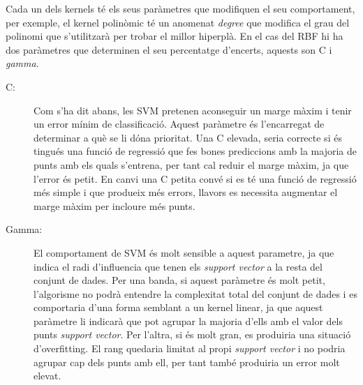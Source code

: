 \documentclass[10pt,a4paper,twocolumn,twoside]{article}
\begin{document}
Cada un dels kernels té els seus paràmetres que modifiquen el seu comportament, per exemple, el kernel polinòmic té un anomenat \textit{degree} que modifica el grau del polinomi que s'utilitzarà per trobar el millor hiperplà. En el cas del RBF hi ha dos paràmetres que determinen el seu percentatge d'encerts, aquests son C i \textit{gamma}.
\begin{description}
\item[C:] Com s'ha dit abans, les SVM pretenen aconseguir un marge màxim i tenir un error mínim de classificació. Aquest paràmetre és l'encarregat de determinar a què se li dóna prioritat. Una C elevada, seria correcte si és tingués una funció de regressió que fes bones prediccions amb la majoria de punts amb els quals s'entrena, per tant cal reduir el marge màxim, ja que l'error és petit. En canvi una C petita convé si es té una funció de regressió més simple i que produeix més errors, llavors es necessita augmentar el marge màxim per incloure més punts.
\item[Gamma:] El comportament de SVM és molt sensible a aquest parametre, ja que indica el radi d'influencia que tenen els \textit{support vector} a la resta del conjunt de dades. Per una banda, si aquest paràmetre és molt petit, l'algorisme no podrà entendre la complexitat total del conjunt de dades i es comportaria d'una forma semblant a un kernel linear, ja que aquest paràmetre li indicarà que pot agrupar la majoria d'ells amb el valor dels punts \textit{support vector}. Per l'altra, si és molt gran, es produiria una situació d'overfitting. El rang quedaria limitat al propi \textit{support vector} i no podria agrupar cap dels punts amb ell, per tant també produiria un error molt elevat.
\end{description}
\end{document}
